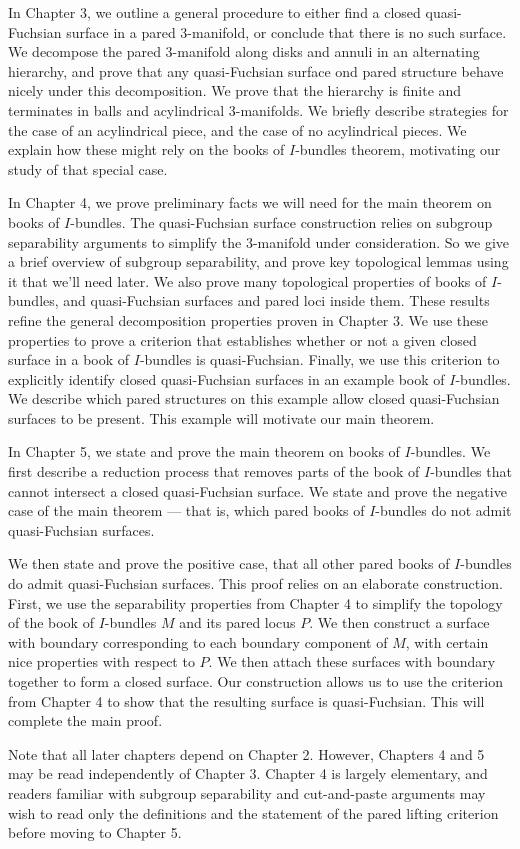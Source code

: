 In Chapter 3, we outline a general procedure to either find a closed
quasi-Fuchsian surface in a pared 3-manifold, or conclude that there is no such
surface.  We decompose the pared 3-manifold along disks and annuli in an
alternating hierarchy, and prove that any quasi-Fuchsian surface ond pared
structure behave nicely under this decomposition. We prove that the hierarchy
is finite and terminates in balls and acylindrical 3-manifolds. We briefly
describe strategies for the case of an acylindrical piece, and the case of no
acylindrical pieces. We explain how these might rely on the books of
$I$-bundles theorem, motivating our study of that special case.

In Chapter 4, we prove preliminary facts we will need for the main theorem on
books of $I$-bundles. The quasi-Fuchsian surface construction relies on
subgroup separability arguments to simplify the 3-manifold under consideration.
So we give a brief overview of subgroup separability, and prove key topological
lemmas using it that we'll need later. We also prove many topological
properties of books of $I$-bundles, and quasi-Fuchsian surfaces and pared loci
inside them.  These results refine the general decomposition properties proven
in Chapter 3.  We use these properties to prove a criterion that establishes
whether or not a given closed surface in a book of $I$-bundles is
quasi-Fuchsian.  Finally, we use this criterion to explicitly identify closed
quasi-Fuchsian surfaces in an example book of $I$-bundles. We describe which
pared structures on this example allow closed quasi-Fuchsian surfaces to be
present. This example will motivate our main theorem.

In Chapter 5, we state and prove the main theorem on books of $I$-bundles. We
first describe a reduction process that removes parts of the book of
$I$-bundles that cannot intersect a closed quasi-Fuchsian surface. We state and
prove the negative case of the main theorem --- that is, which pared books of
$I$-bundles do not admit quasi-Fuchsian surfaces.

We then state and prove the positive case, that all other pared books of
$I$-bundles do admit quasi-Fuchsian surfaces. This proof relies on an elaborate
construction. First, we use the separability properties from Chapter 4 to
simplify the topology of the book of $I$-bundles $M$ and its pared locus $P$.
We then construct a surface with boundary corresponding to each boundary
component of $M$, with certain nice properties with respect to $P$. We then
attach these surfaces with boundary together to form a closed surface. Our
construction allows us to use the criterion from Chapter 4 to show that the
resulting surface is quasi-Fuchsian. This will complete the main proof.

Note that all later chapters depend on Chapter 2. However, Chapters 4 and 5 may
be read independently of Chapter 3. Chapter 4 is largely elementary, and
readers familiar with subgroup separability and cut-and-paste arguments may
wish to read only the definitions and the statement of the pared lifting
criterion before moving to Chapter 5.
